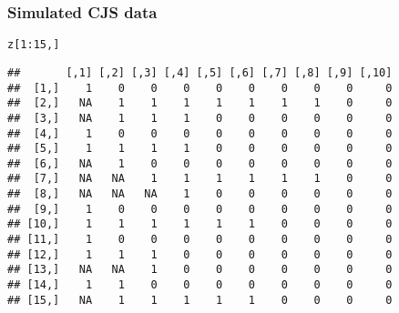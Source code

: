 \documentclass[color=usenames,dvipsnames]{beamer}\usepackage[]{graphicx}\usepackage[]{color}
\makeatletter
\newcommand{\hlnum}[1]{\textcolor[rgb]{0.69,0.494,0}{#1}}%
\newcommand{\hlopt}[1]{\textcolor[rgb]{0,0,0}{#1}}%
\newcommand{\hlstd}[1]{\textcolor[rgb]{0,0,0}{#1}}%
\newenvironment{kframe}{%
 \def\at@end@of@kframe{}%
 \ifinner\ifhmode%
  \def\at@end@of@kframe{\end{minipage}}%
  \begin{minipage}{\columnwidth}%
 \fi\fi%
 \def\FrameCommand##1{\hskip\@totalleftmargin \hskip-\fboxsep
 \colorbox{shadecolor}{##1}\hskip-\fboxsep
     \hskip-\linewidth \hskip-\@totalleftmargin \hskip\columnwidth}%
 \MakeFramed {\advance\hsize-\width
   \@totalleftmargin\z@ \linewidth\hsize
   \@setminipage}}%
 {\par\unskip\endMakeFramed%
 \at@end@of@kframe}
\newenvironment{knitrout}{}{} %
\makeatother
\begin{document}
\begin{frame}[fragile]
  \frametitle{Simulated CJS data}
\begin{knitrout}\small
{}\color{fgcolor}\begin{kframe}
\begin{alltt}
\hlstd{z[}\hlnum{1}\hlopt{:}\hlnum{15}\hlstd{,]}
\end{alltt}
\begin{verbatim}
##       [,1] [,2] [,3] [,4] [,5] [,6] [,7] [,8] [,9] [,10]
##  [1,]    1    0    0    0    0    0    0    0    0     0
##  [2,]   NA    1    1    1    1    1    1    1    0     0
##  [3,]   NA    1    1    1    0    0    0    0    0     0
##  [4,]    1    0    0    0    0    0    0    0    0     0
##  [5,]    1    1    1    1    0    0    0    0    0     0
##  [6,]   NA    1    0    0    0    0    0    0    0     0
##  [7,]   NA   NA    1    1    1    1    1    1    0     0
##  [8,]   NA   NA   NA    1    0    0    0    0    0     0
##  [9,]    1    0    0    0    0    0    0    0    0     0
## [10,]    1    1    1    1    1    1    0    0    0     0
## [11,]    1    0    0    0    0    0    0    0    0     0
## [12,]    1    1    1    0    0    0    0    0    0     0
## [13,]   NA   NA    1    0    0    0    0    0    0     0
## [14,]    1    1    0    0    0    0    0    0    0     0
## [15,]   NA    1    1    1    1    1    0    0    0     0
\end{verbatim}
\end{kframe}
\end{knitrout}
\end{frame}







\end{document}
